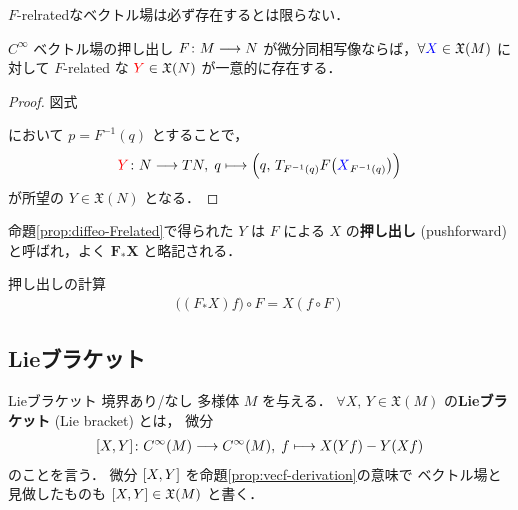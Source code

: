 \documentclass[TQFT_main]{subfiles}
\begin{document}
$F$-relratedなベクトル場は必ず存在するとは限らない．

\begin{myprop}[label=prop:diffeo-Frelated]{$C^\infty$ ベクトル場の押し出し}
    $F \colon M \longrightarrow N$ が微分同相写像ならば，$\forall \textcolor{blue}{X} \in \mathfrak{X}(M)$ に対して $F$-related な $\textcolor{red}{Y} \in \mathfrak{X}(N)$ が一意的に存在する．
\end{myprop}

\begin{proof}
    図式
    \begin{center}
    \end{center}
    において $p = F^{-1}(q)$ とすることで，
    \begin{align}
        \textcolor{red}{Y} \colon N \longrightarrow TN,\; q \longmapsto \Bigl( q,\, T_{F^{-1}(q)} F \bigl(\textcolor{blue}{X}_{F^{-1}(q)}\bigr)  \Bigr) 
    \end{align}
    が所望の $Y \in \mathfrak{X}(N)$ となる．
\end{proof}

\begin{marker}
    命題\ref{prop:diffeo-Frelated}で得られた $Y$ は $F$ による $X$ の\textbf{押し出し} (pushforward) と呼ばれ，よく $\bm{F_* X}$ と略記される．
\end{marker}


\begin{mycol}[label=col:pushforward]{押し出しの計算}
    \begin{align}
        \bigl( (F_* X) f \bigr) \circ F = X(f \circ F)
    \end{align}
\end{mycol}

\subsection{Lieブラケット}

\begin{mydef}[label=def:Lie-bracket]{Lieブラケット}
    境界あり/なし \cinfty 多様体 $M$ を与える．
    $\forall X,\, Y \in \mathfrak{X}(M)$ の\textbf{Lieブラケット} (Lie bracket) とは，
    微分
    \begin{align}
        \label{eq:Liebracket}
        \comm{X}{Y} \colon C^\infty (M) \lto C^\infty (M),\; f \lmto X(Y f) - Y(X f)
    \end{align}
    のことを言う．
    \tcblower
    微分 $\comm{X}{Y}$ を命題\ref{prop:vecf-derivation}の意味で \cinfty ベクトル場と見做したものも $\comm{X}{Y} \in \mathfrak{X}(M)$ と書く．
\end{mydef}
\end{document}
